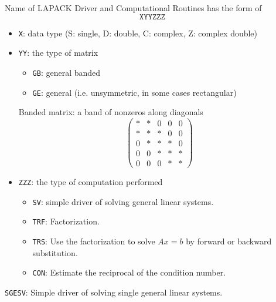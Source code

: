 \begin{definition}
    Name of LAPACK Driver and Computational Routines has the form of \[
        \boxed{\texttt{XYYZZZ}}
    \]
    \begin{itemize}
        \item \texttt{X}: data type (S: single, D: double, C: complex, Z: complex double)
        \item \texttt{YY}: the type of matrix 
        \begin{itemize}
            \item \texttt{GB}: general banded
            \item \texttt{GE}: general (i.e. unsymmetric, in some cases rectangular)
        \end{itemize}
        \begin{note}
            Banded matrix: a band of nonzeros along diagonals
            \[
                \begin{pmatrix}
                    * & * & 0 & 0 & 0 \\
                    * & * & * & 0 & 0 \\
                    0 & * & * & * & 0 \\
                    0 & 0 & * & * & * \\
                    0 & 0 & 0 & * & *
                \end{pmatrix}
            \]
        \end{note}
        \item \texttt{ZZZ}: the type of computation performed
        \begin{itemize}
            \item \texttt{SV}: simple driver of solving general linear systems.
            \item \texttt{TRF}: Factorization.
            \item \texttt{TRS}: Use the factorization to solve $Ax = b$ by forward or backward substitution.
            \item \texttt{CON}: Estimate the reciprocal of the condition number.
        \end{itemize}
    \end{itemize}
\end{definition}

\begin{eg}
    \texttt{SGESV}: Simple driver of solving single general linear systems.
\end{eg}

